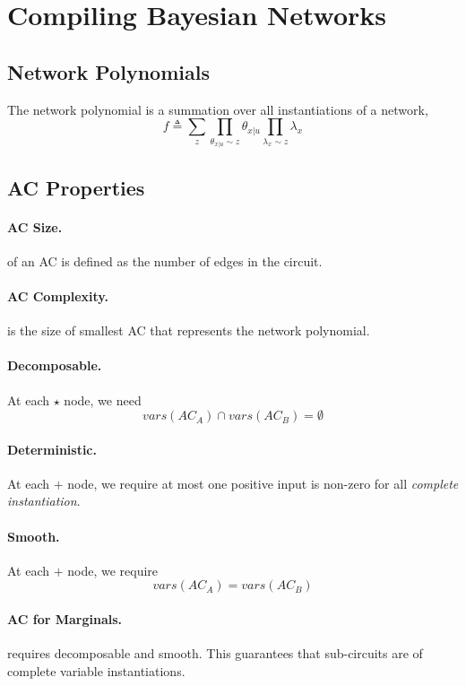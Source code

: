 \documentclass[11pt]{article}
\begin{document}
\section{Compiling Bayesian Networks}
\subsection{Network Polynomials}
The network polynomial is a summation over all instantiations of a network, 
\begin{equation}
	f \triangleq \sum_z \prod_{\theta_{x | u} \sim z }\theta _{x | u} \prod _{\lambda _x \sim z} \lambda_x
\end{equation}

\subsection{AC Properties}
\paragraph{AC Size.}
of an AC is defined as the number of edges in the circuit.  
\paragraph{AC Complexity.}
is the size of smallest AC that represents the network polynomial. 

\paragraph{Decomposable.}
At each $\star$ node, we need 
\begin{equation}
	vars(AC_A) \cap vars(AC_B) = \emptyset
\end{equation}

\paragraph{Deterministic.}
At each $+$ node, we require at most one positive input is non-zero for all \textit{complete instantiation}. 

\paragraph{Smooth.}
At each $+$ node, we require 
\begin{equation}
	vars(AC_A) = vars(AC_B)
\end{equation}

\paragraph{AC for Marginals.} requires decomposable and smooth. This guarantees that sub-circuits are of complete variable instantiations. 
\end{document}
